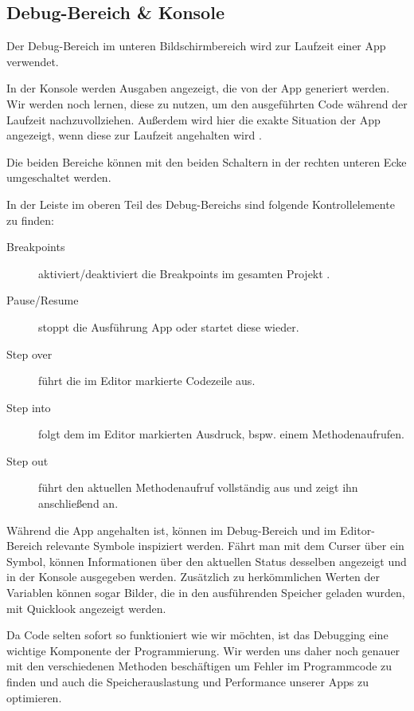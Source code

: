 \documentclass[parskip=half, final]{scrreprt}
\begin{document}
\subsection{Debug-Bereich \& Konsole}\label{sec:debugarea}

Der Debug-Bereich im unteren Bildschirmbereich wird zur Laufzeit einer App verwendet.

In der Konsole werden Ausgaben angezeigt, die von der App generiert werden. Wir werden noch lernen, diese zu nutzen, um den ausgeführten Code während der Laufzeit nachzuvollziehen. Außerdem wird hier die exakte Situation der App angezeigt, wenn diese zur Laufzeit angehalten wird .


Die beiden Bereiche können mit den beiden Schaltern in der rechten unteren Ecke umgeschaltet werden.

In der Leiste im oberen Teil des Debug-Bereichs sind folgende Kontrollelemente zu finden:
\begin{description}
\item[Breakpoints] aktiviert/deaktiviert die Breakpoints im gesamten Projekt .
\item[Pause/Resume] stoppt die Ausführung App oder startet diese wieder.
\item[Step over] führt die im Editor markierte Codezeile aus.
\item[Step into] folgt dem im Editor markierten Ausdruck, bspw. einem Methodenaufrufen.
\item[Step out] führt den aktuellen Methodenaufruf vollständig aus und zeigt ihn anschließend an.
\end{description}

Während die App angehalten ist, können im Debug-Bereich und im Editor-Bereich relevante Symbole inspiziert werden. Fährt man mit dem Curser über ein Symbol, können Informationen über den aktuellen Status desselben angezeigt und in der Konsole ausgegeben werden. Zusätzlich zu herkömmlichen Werten der Variablen können sogar Bilder, die in den ausführenden Speicher geladen wurden, mit Quicklook angezeigt werden.

Da Code selten sofort so funktioniert wie wir möchten, ist das Debugging eine wichtige Komponente der Programmierung. Wir werden uns daher noch genauer mit den verschiedenen Methoden beschäftigen um Fehler im Programmcode zu finden und auch die Speicherauslastung und Performance unserer Apps zu optimieren.
\end{document}
